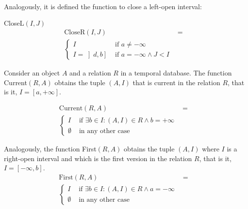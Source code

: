 Analogously, it is defined the function to close a left-open interval: 
\begin{definition}
\label{def:close-a-crisp-interval-l}
CloseL$\left(I, J\right)$ 
\begin{align}
\mbox{CloseR} \left( I, J \right) &=& \\ 
\begin{cases}
\nonumber
I & \mbox{ if } a \neq -\infty \\
I=\left]d, b \right] & \mbox{ if } a = -\infty \wedge J < I
\end{cases}
\end{align}
\end{definition}

\begin{definition}
\label{def:current-in-relation}
Consider an object $A$ and a relation $R$ in a temporal database. The function Current$\left(R, A \right)$ obtains the tuple $\left(A, I \right)$ that is current in the relation $R$, that is it, $I = \left[a, +\infty \right]$.

\begin{align}
\label{eq:current-in-relation}
\mbox{Current} \left(R, A \right) &=& \\ 
\begin{cases}
\nonumber
I & \mbox{ if } \exists b \in I : (A,I) \in R \wedge b = +\infty \\
\emptyset & \mbox{ in any other case }
\end{cases}
\end{align}
\end{definition}


\begin{definition}
\label{def:first-in-relation}
Analogously, the function First$\left(R, A \right)$ obtains the tuple $\left(A, I \right)$ where $I$ is a right-open interval and which is the first version in the relation $R$, that is it, $I = \left[-\infty, b \right]$.
\begin{align}
\label{eq:first-in-relation}
\mbox{First} \left(R, A \right) &=& \\ 
\begin{cases}
\nonumber
I & \mbox{ if } \exists b \in I : (A,I) \in R \wedge a = -\infty \\
\emptyset & \mbox{ in any other case }
\end{cases}
\end{align}

\end{definition}



